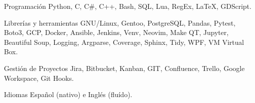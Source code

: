 

\begin{cvskills}

  \cvskill
    {Programación} %
    {Python, C, C\#, C++, Bash, SQL, Lua, RegEx, LaTeX, GDScript.} %

  \cvskill
    {Librerías y herramientas}
    {GNU/Linux, Gentoo, PostgreSQL, Pandas, Pytest, Boto3, GCP, Docker, Ansible, Jenkins, Venv, Neovim, Make}
  \cvskill
    {}
    {QT, Jupyter, Beautiful Soup, Logging, Argparse, Coverage, Sphinx, Tidy, WPF, VM Virtual Box.}

  \cvskill
    {Gestión de Proyectos}
    {Jira, Bitbucket, Kanban, GIT, Confluence, Trello, Google Workspace, Git Hooks.}

  \cvskill
    {Idiomas}
    {Español (nativo) e Inglés (fluído).}


\end{cvskills}
